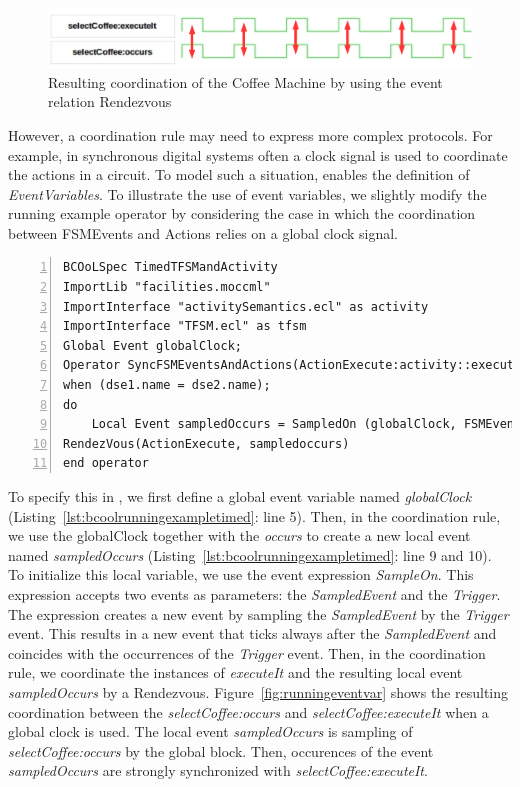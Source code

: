 	\begin{figure}[h]
		\center
		\includegraphics[width=.8\textwidth]{bcool/figs/runningrdv}
		\caption{Resulting coordination of the Coffee Machine by using the event relation Rendezvous}
		\label{fig:runningrdv}
	\end{figure}
		
However, a coordination rule may need to express more complex protocols. For example, in synchronous digital systems often a clock signal is used to coordinate the actions in a circuit. To model such a situation, \bcool enables the definition of \emph{EventVariables}. To illustrate the use of event variables, we slightly modify the running example operator by considering the case in which the coordination between FSMEvents and Actions relies on a global clock signal.
	
\begin{lstlisting}[language=bcool,
caption={Synchronized product operator between the TFSM and Activity languages by using Event Variables},
label={lst:bcoolrunningexampletimed}, 
basicstyle=\scriptsize\ttfamily, backgroundcolor=\color{LGrey}, numbers=left, xleftmargin=2pt]
BCOoLSpec TimedTFSMandActivity
ImportLib "facilities.moccml"
ImportInterface "activitySemantics.ecl" as activity
ImportInterface "TFSM.ecl" as tfsm
Global Event globalClock;
Operator SyncFSMEventsAndActions(ActionExecute:activity::executeIt, FSMEventOccurs:tfsm::occurs)
when (dse1.name = dse2.name);
do
	Local Event sampledOccurs = SampledOn (globalClock, FSMEventOccurs);
RendezVous(ActionExecute, sampledoccurs)
end operator
\end{lstlisting}
			
To specify this in \bcool, we first define a global event variable named \emph{globalClock} (Listing~\ref{lst:bcoolrunningexampletimed}: line 5). Then, in the coordination rule, we use the globalClock together with the \dse \emph{occurs} to create a new local event named \emph{sampledOccurs} (Listing~\ref{lst:bcoolrunningexampletimed}: line 9 and 10). To initialize this local variable, we use the event expression \emph{SampleOn}. This expression accepts two events as parameters: the \emph{SampledEvent} and the \emph{Trigger}. The expression creates a new event by sampling the \emph{SampledEvent} by the \emph{Trigger} event. This results in a new event that ticks always after the \emph{SampledEvent} and coincides with the occurrences of the \emph{Trigger} event. Then, in the coordination rule, we coordinate the instances of \dse \emph{executeIt} and the resulting local event \emph{sampledOccurs} by a Rendezvous. Figure~\ref{fig:runningeventvar} shows the resulting coordination between the \mse \emph{selectCoffee:occurs} and \emph{selectCoffee:executeIt} when a global clock is used. The local event \emph{sampledOccurs} is sampling of \mse \emph{selectCoffee:occurs} by the global block. Then, occurences of the event \emph{sampledOccurs} are strongly synchronized with \mse \emph{selectCoffee:executeIt}.

